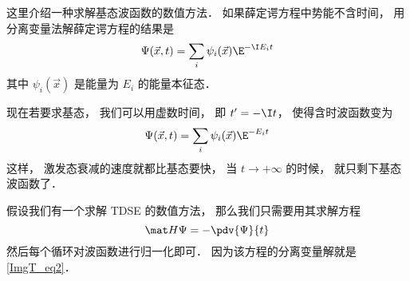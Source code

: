 这里介绍一种求解基态波函数的数值方法． 如果薛定谔方程中势能不含时间， 用分离变量法解薛定谔方程的结果是
\begin{equation}
\Psi(\vec x, t) = \sum_i \psi_i(\vec x) \E^{-\I E_i t}
\end{equation}
其中 $\psi_i(\vec x)$ 是能量为 $E_i$ 的能量本征态．

现在若要求基态， 我们可以用虚数时间， 即 $t' = -\I t$， 使得含时波函数变为
\begin{equation}\label{ImgT_eq2}
\Psi(\vec x, t) = \sum_i \psi_i(\vec x) \E^{- E_i t}
\end{equation}
这样， 激发态衰减的速度就都比基态要快， 当 $t \to +\infty$ 的时候， 就只剩下基态波函数了．

假设我们有一个求解 TDSE 的数值方法， 那么我们只需要用其求解方程
\begin{equation}
\mat H\Psi = -\pdv{\Psi}{t}
\end{equation}
然后每个循环对波函数进行归一化即可． 因为该方程的分离变量解就是\autoref{ImgT_eq2}．